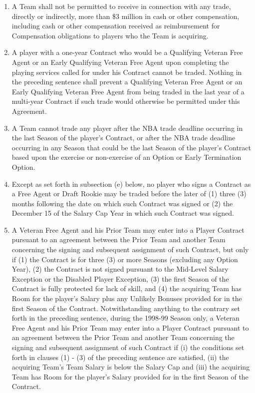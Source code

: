 \documentclass[
]{book}
\providecommand{\tightlist}{%
  \setlength{\itemsep}{0pt}\setlength{\parskip}{0pt}}
\begin{document}
\begin{enumerate}
\def\labelenumi{(\alph{enumi})}
\tightlist
\item
  A Team shall not be permitted to receive in connection with any trade, directly or indirectly, more than \$3 million in cash or other compensation, including cash or other compensation received as reimbursement for Compensation obligations to players who the Team is acquiring.
\item
  A player with a one-year Contract who would be a Qualifying Veteran Free Agent or an Early Qualifying Veteran Free Agent upon completing the playing services called for under his Contract cannot be traded. Nothing in the preceding sentence shall prevent a Qualifying Veteran Free Agent or an Early Qualifying Veteran Free Agent from being traded in the last year of a multi-year Contract if such trade would otherwise be permitted under this Agreement.
\item
  A Team cannot trade any player after the NBA trade deadline occurring in the last Season of the player's Contract, or after the NBA trade deadline occurring in any Season that could be the last Season of the player's Contract based upon the exercise or non-exercise of an Option or Early Termination Option.
\item
  Except as set forth in subsection (e) below, no player who signs a Contract as a Free Agent or Draft Rookie may be traded before the later of (1) three (3) months following the date on which such Contract was signed or (2) the December 15 of the Salary Cap Year in which such Contract was signed.
\item
  A Veteran Free Agent and his Prior Team may enter into a Player Contract pursuant to an agreement between the Prior Team and another Team concerning the signing and subsequent assignment of such Contract, but only if (1) the Contract is for three (3) or more Seasons (excluding any Option Year), (2) the Contract is not signed pursuant to the Mid-Level Salary Exception or the Disabled Player Exception, (3) the first Season of the Contract is fully protected for lack of skill, and (4) the acquiring Team has Room for the player's Salary plus any Unlikely Bonuses provided for in the first Season of the Contract. Notwithstanding anything to the contrary set forth in the preceding sentence, during the 1998-99 Season only, a Veteran Free Agent and his Prior Team may enter into a Player Contract pursuant to an agreement between the Prior Team and another Team concerning the signing and subsequent assignment of such Contract if (i) the conditions set forth in clauses (1) - (3) of the preceding sentence are satisfied, (ii) the acquiring Team's Team Salary is below the Salary Cap and (iii) the acquiring Team has Room for the player's Salary provided for in the first Season of the Contract.

\end{enumerate}
\end{document}
